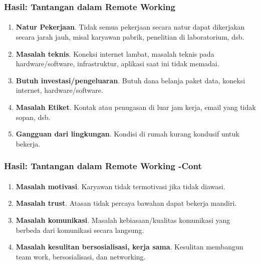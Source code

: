 \documentclass[aspectratio=169, table]{beamer}
\begin{document}
	\begin{frame}
		\frametitle{Hasil: Tantangan dalam Remote Working}
		\framesubtitle{\hspace{1cm}}
		\begin{enumerate}
			\item \textbf{Natur Pekerjaan}. Tidak semua pekerjaan secara natur dapat dikerjakan secara jarah jauh, misal karyawan pabrik, penelitian di laboratorium, dsb.
			\item \textbf{Masalah teknis}. Koneksi internet lambat, masalah teknis pada hardware/software, infrastruktur, aplikasi saat ini tidak memadai.
			\item \textbf{Butuh investasi/pengeluaran}. Butuh dana belanja paket data, koneksi internet, hardware/software.
			\item \textbf{Masalah Etiket}. Kontak atau penugasan di luar jam kerja, email yang tidak sopan, dsb.
			\item \textbf{Gangguan dari lingkungan}. Kondisi di rumah kurang kondusif untuk bekerja.
			
		\end{enumerate}
	\end{frame}
	
	\begin{frame}
		\frametitle{Hasil: Tantangan dalam Remote Working -Cont}
		\framesubtitle{\hspace{1cm}}
		\begin{enumerate}
			
			\item \textbf{Masalah motivasi}. Karyawan tidak termotivasi jika tidak diawasi.
			\item \textbf{Masalah trust}. Atasan tidak percaya bawahan dapat bekerja mandiri.
			\item \textbf{Masalah komunikasi}. Masalah  kebiasaan/kualitas komunikasi yang berbeda dari komunikasi secara langsung.
			\item \textbf{Masalah kesulitan bersosialisasi, kerja sama}. Kesulitan membangun team work, bersosialisasi, dan networking.
		\end{enumerate}
	\end{frame}
	
\end{document}
